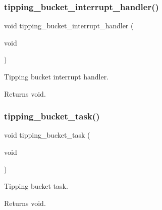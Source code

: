 \subsubsection{\texorpdfstring{tipping\+\_\+bucket\+\_\+interrupt\+\_\+handler()}{tipping\_bucket\_interrupt\_handler()}}
{\footnotesize\ttfamily void tipping\+\_\+bucket\+\_\+interrupt\+\_\+handler (\begin{DoxyParamCaption}\item[{void}]{ }\end{DoxyParamCaption})}



Tipping bucket interrupt handler. 

\begin{DoxyReturn}{Returns}
void. 
\end{DoxyReturn}
\mbox{\label{i2c-rain_8ino_a009edfb36e6432603ed0ede845e2c12d}} 
\subsubsection{\texorpdfstring{tipping\+\_\+bucket\+\_\+task()}{tipping\_bucket\_task()}}
{\footnotesize\ttfamily void tipping\+\_\+bucket\+\_\+task (\begin{DoxyParamCaption}\item[{void}]{ }\end{DoxyParamCaption})}



Tipping bucket task. 

\begin{DoxyReturn}{Returns}
void. 
\end{DoxyReturn}
